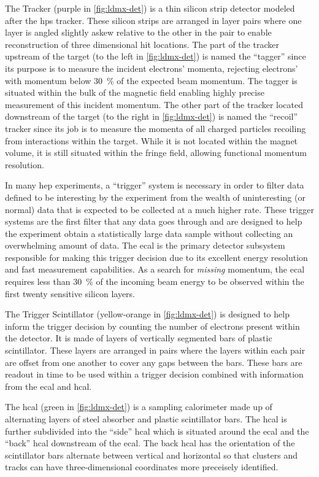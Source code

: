 The Tracker (purple in \cref{fig:ldmx-det}) is a thin silicon strip detector modeled after the
\ac{hps} tracker. These silicon strips are arranged in layer pairs where one layer is angled
slightly askew relative to the other in the pair to enable reconstruction of three dimensional hit
locations. The part of the tracker upstream of the target (to the left in \cref{fig:ldmx-det}) is
named the ``tagger'' since its purpose is to measure the incident electrons' momenta, rejecting
electrons' with momentum below \qty{30}{\percent} of the expected beam momentum. The tagger is situated within
the bulk of the magnetic field enabling highly precise measurement of this incident momentum. The
other part of the tracker located downstream of the target (to the right in \cref{fig:ldmx-det}) is
named the ``recoil'' tracker since its job is to measure the momenta of all charged particles
recoiling from interactions within the target. While it is not located within the magnet volume, it
is still situated within the fringe field, allowing functional momentum resolution.

In many \ac{hep} experiments, a ``trigger'' system is necessary in order to filter data defined to
be interesting by the experiment from the wealth of uninteresting (or normal) data that is expected
to be collected at a much higher rate. These trigger systems are the first filter that any data goes
through and are designed to help the experiment obtain a statistically large data sample without
collecting an overwhelming amount of data. The \ac{ecal} is the primary detector subsystem responsible
for making this trigger decision due to its excellent energy resolution and fast measurement capabilities.
As a search for \emph{missing} momentum, the \ac{ecal} requires less than \qty{30}{\percent} of the incoming
beam energy to be observed within the first twenty sensitive silicon layers.

The Trigger Scintillator (yellow-orange in \cref{fig:ldmx-det}) is designed to help inform the trigger
decision by counting the number of electrons present within the detector. It is made of layers of vertically
segmented bars of plastic scintillator. These layers are arranged in pairs where the layers within
each pair are offset from one another to cover any gaps between the bars. These bars are readout in
time to be used within a trigger decision combined with information from the \ac{ecal} and \ac{hcal}.

The \ac{hcal} (green in \cref{fig:ldmx-det}) is a sampling calorimeter made up of alternating
layers of steel absorber and plastic scintillator bars. The \ac{hcal} is further subdivided into
the ``side'' \ac{hcal} which is situated around the \ac{ecal} and the ``back'' \ac{hcal}
downstream of the \ac{ecal}. The back \ac{hcal} has the orientation of the scintillator bars
alternate between vertical and horizontal so that clusters and tracks can have three-dimensional
coordinates more preceisely identified.

